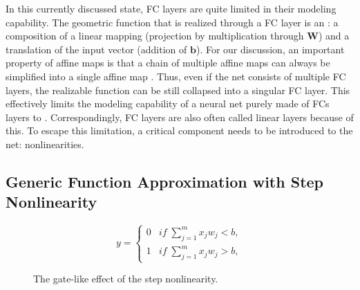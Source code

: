 			In this currently discussed state, \ac{FC} layers are quite limited in their modeling capability.
			The geometric function that is realized through a \ac{FC} layer is an : a composition of a linear mapping (projection by multiplication through $\mathbf{W}$) and a translation of the input vector (addition of $\mathbf{b}$).
			For our discussion, an important property of affine maps is that a chain of multiple affine maps can always be simplified into a single affine map \cite{linalg_book}.
			Thus, even if the net consists of multiple \ac{FC} layers, the realizable function can be still collapsed into a singular \ac{FC} layer.
			This effectively limits the modeling capability of a neural net purely made of \acp{FC} layers to .
			Correspondingly, \ac{FC} layers are also often called linear layers because of this.
			To escape this limitation, a critical component needs to be introduced to the net: nonlinearities.
		
		\subsection{Generic Function Approximation with Step Nonlinearity}
		
			\begin{figure}[ht]
				\centering
				\begin{minipage}[t]{0.4\linewidth}
					\begin{equation}
						y = \begin{cases}
						0 & if\; \sum_{j=1}^{m} x_{j}w_{j} < b, \\
						1 & if\; \sum_{j=1}^{m} x_{j}w_{j} > b,
						\end{cases}
					\end{equation}
				\end{minipage}
				\begin{minipage}[t]{0.3\linewidth}
				\end{minipage}
				\caption[Step nonlinearity]{The gate-like effect of the step nonlinearity.}
				\label{fig:nonlins_step}	
			\end{figure}
			
